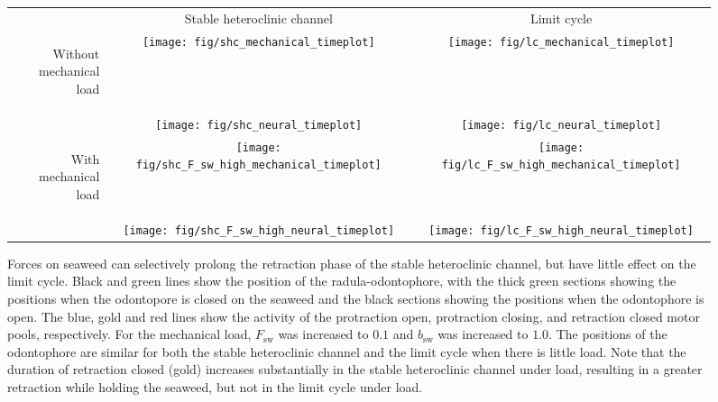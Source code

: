 \begin{figure}
    \centering
    \begin{tabular}{rc@{\ }c}
        & Stable heteroclinic channel & Limit cycle \\
        \begin{sideways}\hskip -10mm\parbox{20mm}{\centering Without\\mechanical load}\end{sideways} &
            \texttt{[image: fig/shc\_mechanical\_timeplot]} &
            \texttt{[image: fig/lc\_mechanical\_timeplot]} \\
        &
            \texttt{[image: fig/shc\_neural\_timeplot]} &
            \texttt{[image: fig/lc\_neural\_timeplot]} \\[1 em]
        \begin{sideways}\hskip -10mm\parbox{20mm}{\centering With\\mechanical load}\end{sideways} &
            \texttt{[image: fig/shc\_F\_sw\_high\_mechanical\_timeplot]} &
            \texttt{[image: fig/lc\_F\_sw\_high\_mechanical\_timeplot]} \\
        &
            \texttt{[image: fig/shc\_F\_sw\_high\_neural\_timeplot]} &
            \texttt{[image: fig/lc\_F\_sw\_high\_neural\_timeplot]} \\
    \end{tabular}
    \caption[Effects of mechanical load on timing]{
    Forces on seaweed can selectively prolong the retraction phase of the
    stable heteroclinic channel, but have little effect on the limit cycle.  Black and green lines show the
    position of the radula-odontophore, with the thick green sections showing the
    positions when the odontopore is closed on the seaweed and the black sections
    showing the positions when the odontophore is open.  The blue, gold and red
    lines show the activity of the protraction open, protraction closing, and
    retraction closed motor pools, respectively.  For the mechanical load,
    $F_\textrm{sw}$ was increased to $0.1$ and $b_\textrm{sw}$ was increased to
    $1.0$.  The positions of the odontophore are similar for both the stable heteroclinic channel and
    the limit cycle when there is little load.  Note that the duration of retraction
    closed (gold) increases substantially in the stable heteroclinic channel under load, resulting
    in a greater retraction while holding the seaweed, but not in the limit cycle under
    load.}
    \label{fig:timeplot_with_F_sw}
\end{figure}

